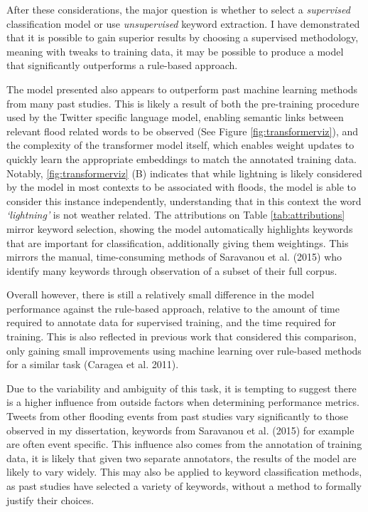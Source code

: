 \documentclass[a4paper, notitlepage]{extreport}
\begin{document}
After these considerations, the major question is whether to select a
\emph{supervised} classification model or use \emph{unsupervised}
keyword extraction. I have demonstrated that it is possible to gain
superior results by choosing a supervised methodology, meaning with
tweaks to training data, it may be possible to produce a model that
significantly outperforms a rule-based approach.

The model presented also appears to outperform past machine learning
methods from many past studies. This is likely a result of both the
pre-training procedure used by the Twitter specific language model,
enabling semantic links between relevant flood related words to be
observed (See Figure \ref{fig:transformerviz}), and the complexity of
the transformer model itself, which enables weight updates to quickly
learn the appropriate embeddings to match the annotated training data.
Notably, \ref{fig:transformerviz} (B) indicates that while lightning is
likely considered by the model in most contexts to be associated with
floods, the model is able to consider this instance independently,
understanding that in this context the word \emph{`lightning'} is not
weather related. The attributions on Table \ref{tab:attributions} mirror
keyword selection, showing the model automatically highlights keywords
that are important for classification, additionally giving them
weightings. This mirrors the manual, time-consuming methods of Saravanou
et al. (2015) who identify many keywords through observation of a subset
of their full corpus.

Overall however, there is still a relatively small difference in the
model performance against the rule-based approach, relative to the
amount of time required to annotate data for supervised training, and
the time required for training. This is also reflected in previous work
that considered this comparison, only gaining small improvements using
machine learning over rule-based methods for a similar task (Caragea et
al. 2011).

Due to the variability and ambiguity of this task, it is tempting to
suggest there is a higher influence from outside factors when
determining performance metrics. Tweets from other flooding events from
past studies vary significantly to those observed in my dissertation,
keywords from Saravanou et al. (2015) for example are often event
specific. This influence also comes from the annotation of training
data, it is likely that given two separate annotators, the results of
the model are likely to vary widely. This may also be applied to keyword
classification methods, as past studies have selected a variety of
keywords, without a method to formally justify their choices.
\end{document}
